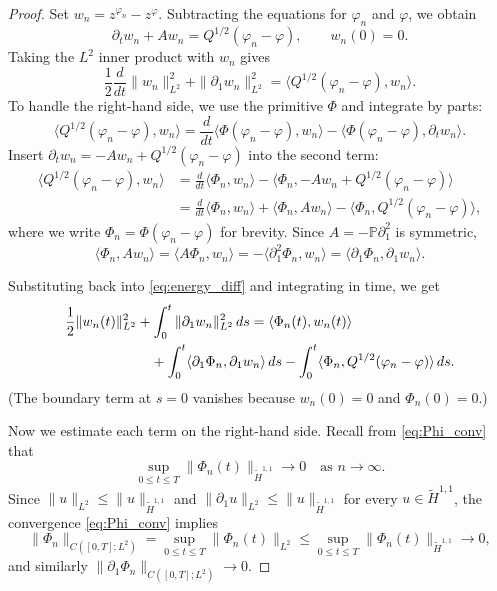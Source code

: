 \documentclass[11pt,a4paper,reqno]{amsart}
\theoremstyle{definition}
\begin{document}
\begin{proof}
  Set $w_n = z^{\varphi_n} - z^\varphi$. Subtracting the equations for $\varphi_n$ and $\varphi$,
  we obtain
  \begin{equation}\label{eq:diff_ske}
    \partial_t w_n + A w_n = Q^{1/2}(\varphi_n-\varphi),\qquad w_n(0)=0.
  \end{equation}
  Taking the $L^2$ inner product with $w_n$ gives
  \begin{equation}\label{eq:energy_diff}
    \frac12\frac{d}{dt}\|w_n\|_{L^2}^2 + \|\partial_1 w_n\|_{L^2}^2
    = \langle Q^{1/2}(\varphi_n-\varphi), w_n\rangle .
  \end{equation}
  To handle the right-hand side, we use the primitive $\Phi$ and integrate by parts:
  \[
    \langle Q^{1/2}(\varphi_n-\varphi), w_n\rangle
    = \frac{d}{dt}\langle \Phi(\varphi_n-\varphi), w_n\rangle
      - \langle \Phi(\varphi_n-\varphi), \partial_t w_n\rangle .
  \]
  Insert $\partial_t w_n = -A w_n + Q^{1/2}(\varphi_n-\varphi)$ into the second term:
  \begin{align*}
    \langle Q^{1/2}(\varphi_n-\varphi), w_n\rangle
    &= \frac{d}{dt}\langle \Phi_n, w_n\rangle
       - \langle \Phi_n, -A w_n + Q^{1/2}(\varphi_n-\varphi)\rangle \\
    &= \frac{d}{dt}\langle \Phi_n, w_n\rangle
       + \langle \Phi_n, A w_n\rangle
       - \langle \Phi_n, Q^{1/2}(\varphi_n-\varphi)\rangle ,
  \end{align*}
  where we write $\Phi_n = \Phi(\varphi_n-\varphi)$ for brevity.
  Since $A = -\mathbb{P}\partial_1^2$ is symmetric,
  \[
    \langle \Phi_n, A w_n\rangle
    = \langle A \Phi_n, w_n\rangle
    = -\langle \partial_1^2 \Phi_n, w_n\rangle
    = \langle \partial_1 \Phi_n, \partial_1 w_n\rangle .
  \]

  Substituting back into \eqref{eq:energy_diff} and integrating in time, we get
  \begin{align}\label{eq:integral_identity}
    \frac12\|w_n(t)\|_{L^2}^2 &+ \int_0^t \|\partial_1 w_n\|_{L^2}^2\,ds
      = \langle \Phi_n(t), w_n(t)\rangle \notag\\
    &\quad + \int_0^t \langle \partial_1 \Phi_n, \partial_1 w_n\rangle\,ds
      - \int_0^t \langle \Phi_n, Q^{1/2}(\varphi_n-\varphi)\rangle\,ds .
  \end{align}
  (The boundary term at $s=0$ vanishes because $w_n(0)=0$ and $\Phi_n(0)=0$.)

  Now we estimate each term on the right-hand side.  Recall from \eqref{eq:Phi_conv} that
  \begin{equation}\label{eq:Phi_small}
    \sup_{0\le t\le T}\|\Phi_n(t)\|_{\widetilde H^{1,1}} \longrightarrow 0 \quad\text{as } n\to\infty .
  \end{equation}
    Since $\|u\|_{L^2} \le \|u\|_{\widetilde H^{1,1}}$ and
  $\|\partial_1 u\|_{L^2} \le \|u\|_{\widetilde H^{1,1}}$ for every $u\in\widetilde H^{1,1}$,
  the convergence \eqref{eq:Phi_conv} implies
  \[
    \|\Phi_n\|_{C([0,T];L^2)}
    = \sup_{0\le t\le T}\|\Phi_n(t)\|_{L^2}
    \le \sup_{0\le t\le T}\|\Phi_n(t)\|_{\widetilde H^{1,1}} \longrightarrow 0,
  \]
  and similarly $\|\partial_1 \Phi_n\|_{C([0,T];L^2)} \to 0$.



\end{proof}
\end{document}
